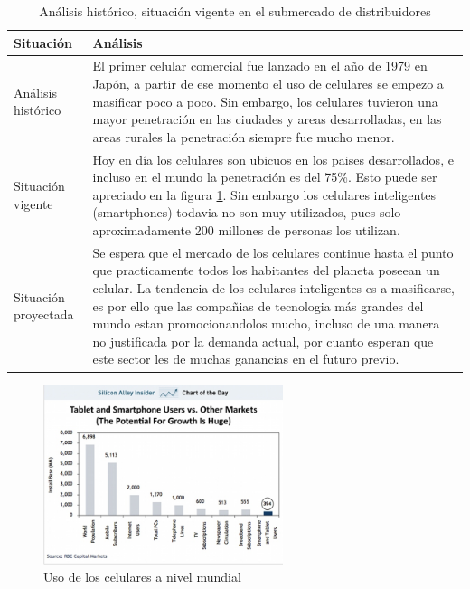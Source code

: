 \documentclass[a4paper, 12pt, oneside]{article}
\begin{document}
	\begin{table}
		\caption{Análisis histórico, situación vigente en el submercado de distribuidores}
		\begin{tabular}{ | p{4cm} | p{10cm} | }
		\hline
		Situación & Análisis \\
		\hline					
		Análisis histórico & 
		El primer celular comercial fue lanzado en el año de 1979 en Japón, a partir de ese momento el uso de celulares se empezo a masificar poco a poco. Sin embargo, los celulares tuvieron una mayor penetración en las ciudades y areas desarrolladas, en las areas rurales la penetración siempre fue mucho menor.
		\\
		\hline
		Situación vigente &
		Hoy en día los celulares son ubicuos en los paises desarrollados, e incluso en el mundo la penetración es del 75\%. Esto puede ser apreciado en la figura \ref{fig:usocel1}.
		Sin embargo los celulares inteligentes (smartphones) todavia no son muy utilizados, pues solo aproximadamente 200 millones de personas los utilizan.
		 \\
		\hline
		Situación proyectada &
		Se espera que el mercado de los celulares continue hasta el punto que practicamente todos los habitantes del planeta poseean un celular. La tendencia de los celulares
		inteligentes es a masificarse, es por ello que las compañias de tecnologia más grandes del mundo estan promocionandolos mucho, incluso de una manera no justificada
		por la demanda actual, por cuanto esperan que este sector les de muchas ganancias en el futuro previo.
		 \\
		\hline
		\end{tabular}
		\label{distHistorico}
	\end{table}

	\begin{figure}[htb]
	\begin{center}
	\leavevmode
	\includegraphics[width=7cm]{img/usocel1.jpg}
	\end{center}
	\caption{Uso de los celulares a nivel mundial}
	\label{fig:usocel1}
	\end{figure}
	
\end{document}
